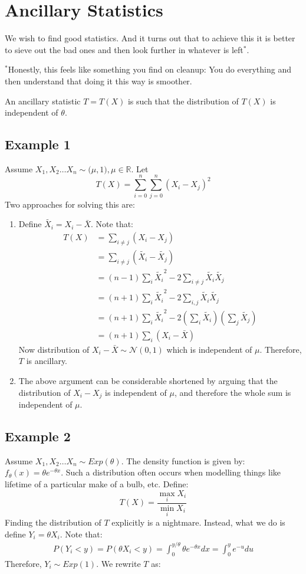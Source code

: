 \documentclass[oneside]{book}
\begin{document}
\section{Ancillary Statistics}
We wish to find good statistics. And it turns out that to achieve this it is better to sieve out the bad ones and then look further in whatever is left$^*$.\\
\begin{marginfigure}%
    \footnotesize $^*$Honestly, this feels like something you find on cleanup: You do everything and then understand that doing it this way is smoother.
\end{marginfigure}%


An ancillary statistic $T=T(X)$ is such that the distribution of $T(X)$ is independent of $\theta$. 
\subsection{Example 1}
Assume $X_1,X_2\hdots X_n\sim\mathcal(\mu,1),\mu\in\mathbb R$. Let
$$T(X)=\sum_{i=0}^n\sum_{j=0}^n(X_i-X_j)^2$$ 
Two approaches for solving this are:
\begin{enumerate}
    \item Define $\tilde{X_i}=X_i-\bar X$. Note that:
        \begin{align*}
            T(X)&=\sum_{i\ne j}(X_i-X_j)\\
            &=\sum_{i\ne j}(\tilde{X_i}-\tilde{X_j})\\
            &=(n-1)\sum_{i}\tilde{X_i}^2-2\sum_{i\ne j}\tilde{X_i}\tilde{X_j}\\
            &=(n+1)\sum_{i}\tilde{X_i}^2-2\sum_{i,j}\tilde{X_i}\tilde{X_j}\\
            &=(n+1)\sum_{i}\tilde{X_i}^2-2\left(\sum_{i}\tilde{X_i}\right)\left(\sum_{j}\tilde{X_j}\right)\\
            &=(n+1)\sum_{i}\left(X_i-\bar X\right)
        \end{align*}
        Now distribution of $X_i-\bar X\sim\mathcal N(0,1)$ which is independent of $\mu$. Therefore, $T$ is ancillary.
    \item The above argument can be considerable shortened by arguing that the distribution of $X_i-X_j$ is independent of $\mu$, and therefore the whole sum is independent of $\mu$.
\end{enumerate}
\subsection{Example 2}
Assume $X_1,X_2\hdots X_n\sim Exp(\theta)$. The density function is given by: $f_\theta(x)=\theta e^{-\theta x}$. Such a distribution often occurs when modelling things like lifetime of a particular make of a bulb, etc. Define:
$$T(X)=\frac{\max_i X_i}{\min_i X_i}$$
Finding the distribution of $T$ explicitly is a nightmare. Instead, what we do is define $Y_i=\theta X_i$. Note that:
\begin{align*}
    P(Y_i<y)=P(\theta X_i<y)=\int_0^{y/\theta}\theta e^{-\theta x}dx=\int_0^ye^{-u}du
\end{align*}
Therefore, $Y_i\sim Exp(1)$. We rewrite $T$ as:
\end{document}

